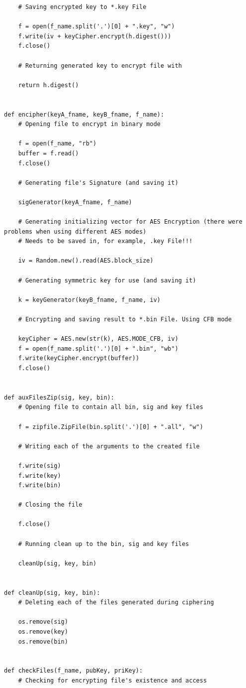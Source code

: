 \documentclass[a4paper,11pt,openright,oneside]{report}
\begin{document}
\begin{verbatim}
    # Saving encrypted key to *.key File

    f = open(f_name.split('.')[0] + ".key", "w")
    f.write(iv + keyCipher.encrypt(h.digest()))
    f.close()

    # Returning generated key to encrypt file with

    return h.digest()


def encipher(keyA_fname, keyB_fname, f_name):
    # Opening file to encrypt in binary mode

    f = open(f_name, "rb")
    buffer = f.read()
    f.close()

    # Generating file's Signature (and saving it)

    sigGenerator(keyA_fname, f_name)

    # Generating initializing vector for AES Encryption (there were problems when using different AES modes)
    # Needs to be saved in, for example, .key File!!!

    iv = Random.new().read(AES.block_size)

    # Generating symmetric key for use (and saving it)

    k = keyGenerator(keyB_fname, f_name, iv)

    # Encrypting and saving result to *.bin File. Using CFB mode

    keyCipher = AES.new(str(k), AES.MODE_CFB, iv)
    f = open(f_name.split('.')[0] + ".bin", "wb")
    f.write(keyCipher.encrypt(buffer))
    f.close()


def auxFilesZip(sig, key, bin):
    # Opening file to contain all bin, sig and key files

    f = zipfile.ZipFile(bin.split('.')[0] + ".all", "w")

    # Writing each of the arguments to the created file

    f.write(sig)
    f.write(key)
    f.write(bin)

    # Closing the file

    f.close()

    # Running clean up to the bin, sig and key files

    cleanUp(sig, key, bin)


def cleanUp(sig, key, bin):
    # Deleting each of the files generated during ciphering

    os.remove(sig)
    os.remove(key)
    os.remove(bin)


def checkFiles(f_name, pubKey, priKey):
    # Checking for encrypting file's existence and access


\end{verbatim}
\end{document}
